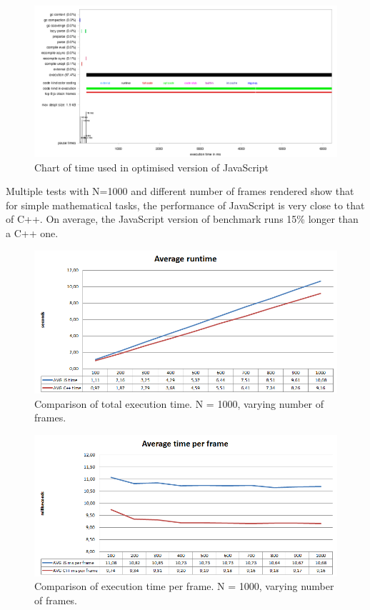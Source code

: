 \begin{figure}[h!]
  \caption{Chart of time used in optimised version of JavaScript}
  \label{img:spheres1profile}
  \centering
	\includegraphics[width=16cm]{spheres/spheres1-profile.png}
\end{figure} 

Multiple tests with N=1000 and different number of frames rendered show that for simple mathematical tasks, the performance of JavaScript is very close to that of C++. On average, the JavaScript version of benchmark runs 15\% longer than a C++ one.

\begin{figure}[h!]
  \caption{Comparison of total execution time. N = 1000, varying number of frames.}
  \label{img:spheres1-time-total}
  \centering
	\includegraphics[width=16cm]{spheres/time-total.png}
\end{figure} 
\begin{figure}[h!]
  \caption{Comparison of execution time per frame. N = 1000, varying number of frames.}
  \label{img:spheres1-time-per-frame}
  \centering
	\includegraphics[width=16cm]{spheres/time-per-frame.png}
\end{figure}

